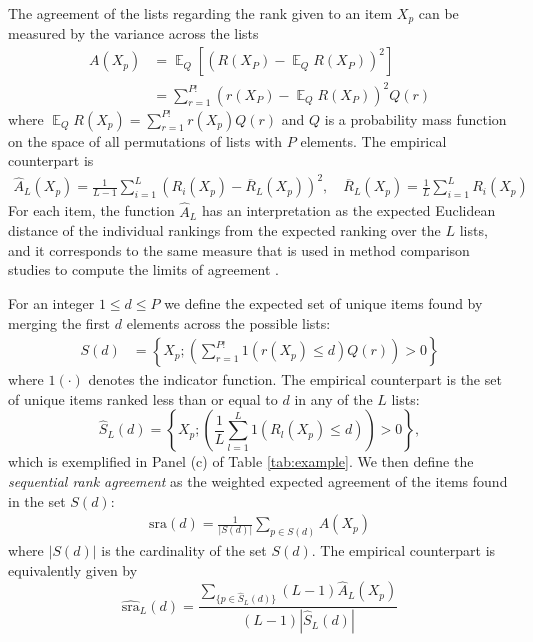 \documentclass[12pt,a4paper]{article}
\newcommand{\nn}{\nonumber}
\DeclareMathOperator{\E}{\mathbb{E}}
\theoremstyle{plain}
\begin{document}
The agreement of the lists regarding the rank given to an item $X_p$
can be measured by the variance across the lists
\begin{align}
  A(X_p) &= \E_Q\left[\left(R(X_P)-\E_Q R(X_P)\right)^2\right]\\
   &= \sum_{r=1}^{P!} \left(r(X_P)-\E_Q R(X_P)\right)^2 Q(r)\nn
\end{align}
where $\E_Q R(X_p)=\sum_{r=1}^{P!} r(X_p)Q(r)$ and $Q$ is a probability mass function
on the space of all permutations of lists with $P$ elements.
The empirical counterpart is
\begin{align}
\widehat{A}_L(X_p) = \frac{1}{L-1}\sum_{i=1}^L (R_i(X_p) - \overline{R}_L(X_p))^2, \quad \overline{R}_L(X_p) = \frac{1}{L}\sum_{i=1}^L R_i(X_p)\label{eq:empDistance}
\end{align}
For each item, the function $\widehat{A}_L$ has an interpretation as the expected
Euclidean distance of the individual rankings from the expected
ranking over the $L$ lists, and it corresponds to the same measure
that is used in method comparison studies to compute the limits of
agreement \citep{alt:bland:1983}.

For an integer $1\le d\le P$ we define the expected set of unique
items found by merging the first $d$ elements across the possible
lists:
\begin{align}
S(d) &= \left\{X_p; \left(\sum_{r=1}^{P!} 1\left(r(X_p)\le d\right) Q(r)\right) >0\right\}\label{eq:sumset}
\end{align}
where $1(\cdot)$ denotes the indicator function.
The empirical counterpart is the set of unique items ranked less than or
equal to $d$ in any of the $L$ lists:
\begin{equation}
\widehat{S}_{L}(d) = \left\{X_p; \left(\frac{1}{L}\sum_{l=1}^L 1\left(R_l(X_p)\le d\right)\right)>0\right\},
\end{equation}
which is exemplified in Panel (c) of Table \ref{tab:example}.
We then define the \emph{sequential rank agreement} as the weighted
expected agreement of the items found in the set $S(d)$:
\begin{align}
  \textrm{sra}(d) = \frac{1}{|S(d)|}\sum_{p \in S(d)}A(X_p)\label{def:sra}
\end{align}
where $|S(d)|$ is the cardinality of the set $S(d)$.
The empirical counterpart is equivalently given by
\begin{equation}
  \widehat{\textrm{sra}}_L(d) = \frac{\sum_{\{p \in \widehat{S}_{L}(d)\}}(L-1)\widehat{A}_L(X_p)}{(L-1)|\widehat {S}_{L}(d)|}\label{def:sraEst}
\end{equation}
\end{document}
